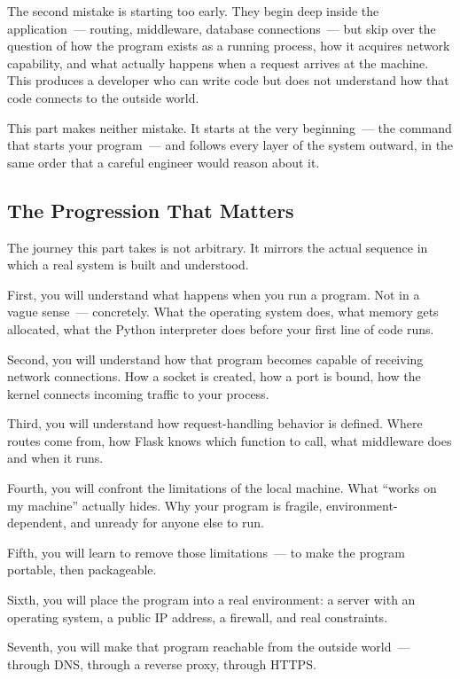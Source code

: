 The second mistake is starting too early. They begin deep inside the application~--- routing, middleware, database connections~--- but skip over the question of how the program exists as a running process, how it acquires network capability, and what actually happens when a request arrives at the machine. This produces a developer who can write code but does not understand how that code connects to the outside world.

This part makes neither mistake. It starts at the very beginning~--- the command that starts your program~--- and follows every layer of the system outward, in the same order that a careful engineer would reason about it.

\subsection*{The Progression That Matters}\label{part4-introduction:the-progression-that-matters}

The journey this part takes is not arbitrary. It mirrors the actual sequence in which a real system is built and understood.

First, you will understand what happens when you run a program. Not in a vague sense~--- concretely. What the operating system does, what memory gets allocated, what the Python interpreter does before your first line of code runs.

Second, you will understand how that program becomes capable of receiving network connections. How a socket is created, how a port is bound, how the kernel connects incoming traffic to your process.

Third, you will understand how request-handling behavior is defined. Where routes come from, how Flask knows which function to call, what middleware does and when it runs.

Fourth, you will confront the limitations of the local machine. What ``works on my machine'' actually hides. Why your program is fragile, environment-dependent, and unready for anyone else to run.

Fifth, you will learn to remove those limitations~--- to make the program portable, then packageable.

Sixth, you will place the program into a real environment: a server with an operating system, a public IP address, a firewall, and real constraints.

Seventh, you will make that program reachable from the outside world~--- through DNS, through a reverse proxy, through HTTPS.

